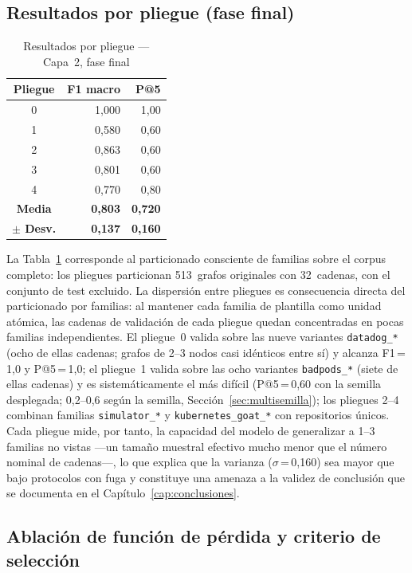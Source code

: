 \subsection{Resultados por pliegue (fase final)}

\begin{table}[htbp]
\centering
\caption{Resultados por pliegue — Capa~2, fase final}
\label{tab:gnn_folds}
\begin{tabular}{@{}crr@{}}
\toprule
Pliegue & F1 macro & P@5 \\
\midrule
0 & 1,000 & 1,00 \\
1 & 0,580 & 0,60 \\
2 & 0,863 & 0,60 \\
3 & 0,801 & 0,60 \\
4 & 0,770 & 0,80 \\
\midrule
\textbf{Media} & \textbf{0,803} & \textbf{0,720} \\
\textbf{\(\pm\) Desv.} & \textbf{0,137} & \textbf{0,160} \\
\bottomrule
\end{tabular}
\fuentepropia
\end{table}

La Tabla~\ref{tab:gnn_folds} corresponde al particionado consciente de familias
sobre el corpus completo: los pliegues particionan 513~grafos originales con
32~cadenas, con el conjunto de test excluido.
La dispersión entre pliegues es consecuencia directa del particionado por
familias: al mantener cada familia de plantilla como unidad atómica, las cadenas
de validación de cada pliegue quedan concentradas en pocas familias
independientes. El pliegue~0 valida sobre las nueve variantes \texttt{datadog\_*}
(ocho de ellas cadenas; grafos de 2--3 nodos casi idénticos entre sí) y alcanza
F1\,=\,1,0 y P@5\,=\,1,0; el pliegue~1 valida sobre las ocho variantes
\texttt{badpods\_*} (siete de ellas cadenas) y
es sistemáticamente el más difícil (P@5\,=\,0,60 con la semilla desplegada;
0,2--0,6 según la semilla, Sección~\ref{sec:multisemilla}); los pliegues 2--4
combinan familias \texttt{simulator\_*} y \texttt{kubernetes\_goat\_*} con
repositorios únicos. Cada pliegue mide, por tanto, la capacidad del modelo de
generalizar a 1--3 familias no vistas —un tamaño muestral efectivo mucho menor
que el número nominal de cadenas—, lo que explica que la varianza
(\(\sigma\)\,=\,0,160) sea mayor que bajo protocolos con fuga y constituye una
amenaza a la validez de conclusión que se documenta en el
Capítulo~\ref{cap:conclusiones}.

\subsection{Ablación de función de pérdida y criterio de selección}
\label{sec:ablacion_perdida}

